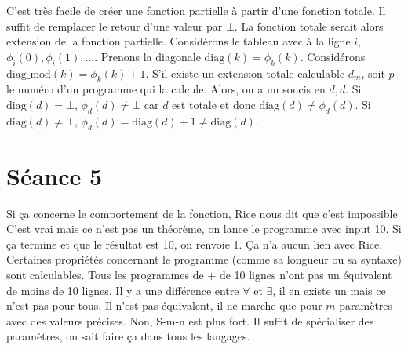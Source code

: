 \begin{mcqs}
  {C'est très facile de créer une fonction partielle à partir d'une fonction totale.
  Il suffit de remplacer le retour d'une valeur par $\bot$. La fonction totale serait alors extension de la fonction partielle.}
  {Considérons le tableau avec à la ligne $i$, $\phi_i(0), \phi_i(1), \ldots$.
  Prenons la diagonale $\mathrm{diag}(k) = \phi_k(k)$.
  Considérons $\mathrm{diag\_mod}(k) = \phi_k(k)+1$.
  S'il existe un extension totale calculable $d_m$, soit $p$ le numéro d'un programme qui la calcule.
  Alors, on a un soucis en $d,d$.
  Si $\mathrm{diag}(d) = \bot$, $\phi_d(d) \neq \bot$ car $d$ est totale et donc $\mathrm{diag}(d) \neq \phi_d(d)$.
  Si $\mathrm{diag}(d) \neq \bot$, $\phi_d(d) = \mathrm{diag}(d) + 1 \neq \mathrm{diag}(d)$.}
\end{mcqs}

\section*{Séance 5}

\begin{mcqs}
  {Si ça concerne le comportement de la fonction, Rice nous dit que c'est impossible}
  {C'est vrai mais ce n'est pas un théorème, on lance le programme avec input 10.
  Si ça termine et que le résultat est 10, on renvoie 1. Ça n'a aucun lien avec Rice.}
  {Certaines propriétés concernant le programme (comme sa longueur ou sa syntaxe) sont calculables.}
  {Tous les programmes de + de 10 lignes n'ont pas un équivalent de moins de 10 lignes. Il y a une différence entre $\forall$ et $\exists$, il en existe un mais ce n'est pas pour tous.}
  {Il n'est pas équivalent, il ne marche que pour $m$ paramètres avec des valeurs précises.}
  {Non, S-m-n est plus fort.}
  {Il suffit de spécialiser des paramètres,
  on sait faire ça dans tous les langages.}
\end{mcqs}

